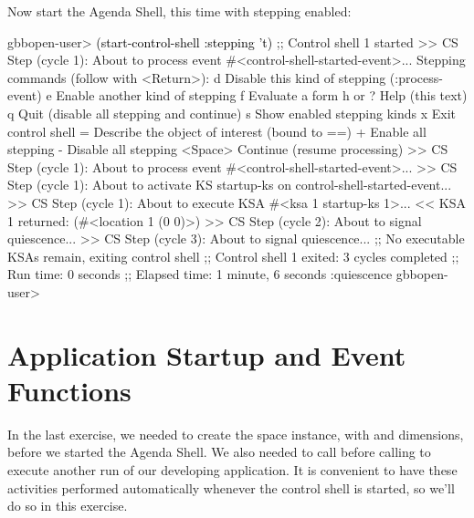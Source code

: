 \documentclass[10pt,twoside,english,pdftex]{article}
\begin{document}
%
%
Now start the Agenda Shell, this time with stepping enabled:
%
\W\supp
\begin{example}
\textcolor{darkergray}{%
  gbbopen-user> \textcolor{black}{(start-control-shell :stepping 't)}
  ;; Control shell 1 started
  >> CS Step (cycle 1):
     About to process event #<control-shell-started-event>... 
  Stepping commands (follow with <Return>):
     d       Disable this kind of stepping (:process-event)
     e       Enable another kind of stepping
     f       Evaluate a form
     h or ?  Help (this text)
     q       Quit (disable all stepping and continue)
     s       Show enabled stepping kinds
     x       Exit control shell
     =       Describe the object of interest (bound to ==)
     +       Enable all stepping
     -       Disable all stepping
     <Space> Continue (resume processing)
  >> CS Step (cycle 1):
     About to process event #<control-shell-started-event>... 
  >> CS Step (cycle 1):
     About to activate KS startup-ks on
       control-shell-started-event... 
  >> CS Step (cycle 1):
     About to execute KSA #<ksa 1 startup-ks 1>... 
  << KSA 1 returned: (#<location 1 (0 0)>)
  >> CS Step (cycle 2):
     About to signal quiescence... 
  >> CS Step (cycle 3):
     About to signal quiescence... 
  ;; No executable KSAs remain, exiting control shell
  ;; Control shell 1 exited: 3 cycles completed
  ;; Run time: 0 seconds
  ;; Elapsed time: 1 minute, 6 seconds
  :quiescence
  gbbopen-user>}
\end{example}


\T\markright{}%
\T\pagestyle{plain}
\T\cleardoublepage
\W{}
\T\pagestyle{fancy}
\T\thispagestyle{fancybottom}
\T\renewcommand{\headrulewidth}{0pt}
\section{Application Startup and Event Functions}
\label{sec:application-startup}%

In the last exercise, we needed to create the  space
instance, with  and  dimensions, before we started the Agenda
Shell.  We also needed to call 
before calling  to execute another run of
our developing application.  It is convenient to have these activities
performed automatically whenever the control shell is started, so we'll do so
in this exercise.
\end{document}

